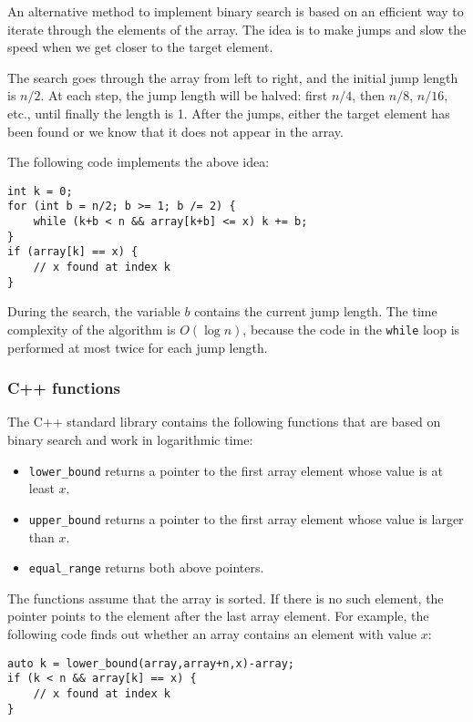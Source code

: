 An alternative method to implement binary search
is based on an efficient way to iterate through
the elements of the array.
The idea is to make jumps and slow the speed
when we get closer to the target element.

The search goes through the array from left to
right, and the initial jump length is $n/2$.
At each step, the jump length will be halved:
first $n/4$, then $n/8$, $n/16$, etc., until
finally the length is 1.
After the jumps, either the target element has
been found or we know that it does not appear in the array.

The following code implements the above idea:
\begin{lstlisting}
int k = 0;
for (int b = n/2; b >= 1; b /= 2) {
    while (k+b < n && array[k+b] <= x) k += b;
}
if (array[k] == x) {
    // x found at index k
}
\end{lstlisting}

During the search, the variable $b$
contains the current jump length.
The time complexity of the algorithm is $O(\log n)$,
because the code in the \texttt{while} loop
is performed at most twice for each jump length.

\subsubsection{C++ functions}

The C++ standard library contains the following functions
that are based on binary search and work in logarithmic time:

\begin{itemize}
\item \texttt{lower\_bound} returns a pointer to the
first array element whose value is at least $x$.
\item \texttt{upper\_bound} returns a pointer to the
first array element whose value is larger than $x$.
\item \texttt{equal\_range} returns both above pointers.
\end{itemize}

The functions assume that the array is sorted.
If there is no such element, the pointer points to
the element after the last array element.
For example, the following code finds out whether
an array contains an element with value $x$:

\begin{lstlisting}
auto k = lower_bound(array,array+n,x)-array;
if (k < n && array[k] == x) {
    // x found at index k
}
\end{lstlisting}

